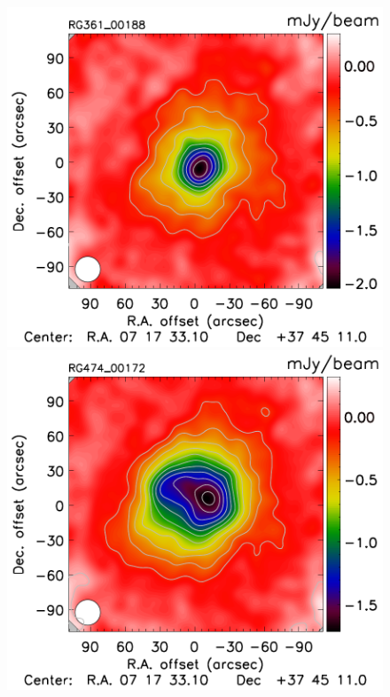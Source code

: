 \documentclass[twocolumn,traditabstract]{aa}
\begin{document}
\begin{figure}[h]
\centering
\includegraphics[trim=0cm 0.7cm 0cm 0cm, clip=true, totalheight=3.7cm]{Figure/Map_RG361_00188_Ymap_zobs0p6_processed.pdf}
\includegraphics[trim=0cm 0.7cm 0cm 0cm, clip=true, totalheight=3.7cm]{Figure/Map_RG474_00172_Ymap_zobs0p9_processed.pdf}

\end{figure}
\end{document}
